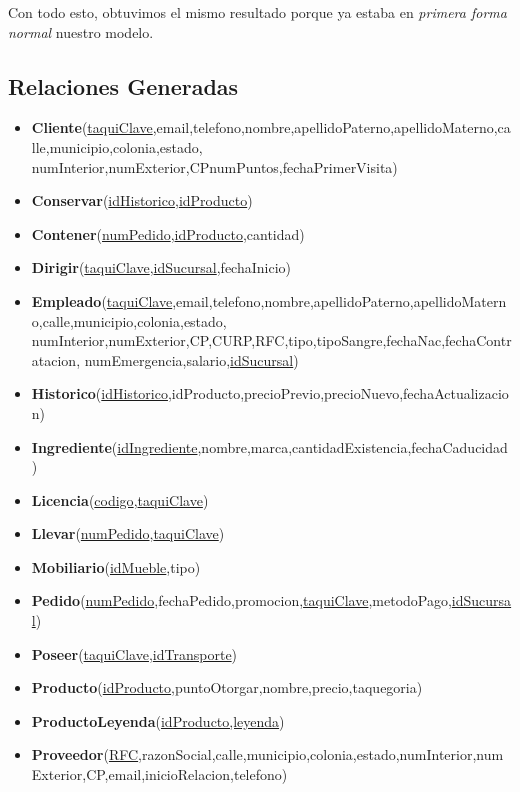 \documentclass[11pt,letterpaper]{article}
\begin{document}
Con todo esto, obtuvimos el mismo resultado porque ya estaba en \textit{primera forma normal} nuestro modelo.

\subsection{Relaciones Generadas}
\begin{itemize}
\item \footnotesize{\textbf{Cliente}(\underline{taquiClave},email,telefono,nombre,apellidoPaterno,apellidoMaterno,calle,municipio,colonia,estado,
numInterior,numExterior,CPnumPuntos,fechaPrimerVisita)}
\item \footnotesize{\textbf{Conservar}(\underline{idHistorico},\underline{idProducto})}
\item \footnotesize{\textbf{Contener}(\underline{numPedido},\underline{idProducto},cantidad)}
\item \footnotesize{\textbf{Dirigir}(\underline{taquiClave},\underline{idSucursal},fechaInicio)}
\item \footnotesize{\textbf{Empleado}(\underline{taquiClave},email,telefono,nombre,apellidoPaterno,apellidoMaterno,calle,municipio,colonia,estado,
numInterior,numExterior,CP,CURP,RFC,tipo,tipoSangre,fechaNac,fechaContratacion,
numEmergencia,salario,\underline{idSucursal})}
\item \footnotesize{\textbf{Historico}(\underline{idHistorico},idProducto,precioPrevio,precioNuevo,fechaActualizacion)}
\item \footnotesize{\textbf{Ingrediente}(\underline{idIngrediente},nombre,marca,cantidadExistencia,fechaCaducidad)}
\item \footnotesize{\textbf{Licencia}(\underline{codigo},\underline{taquiClave}})
\item \footnotesize{\textbf{Llevar}(\underline{numPedido},\underline{taquiClave})}
\item \footnotesize{\textbf{Mobiliario}(\underline{idMueble},tipo)}
\item \footnotesize{\textbf{Pedido}(\underline{numPedido},fechaPedido,promocion,\underline{taquiClave},metodoPago,\underline{idSucursal})}
\item \footnotesize{\textbf{Poseer}(\underline{taquiClave},\underline{idTransporte})}
\item \footnotesize{\textbf{Producto}(\underline{idProducto},puntoOtorgar,nombre,precio,taquegoria)}
\item \footnotesize{\textbf{ProductoLeyenda}(\underline{idProducto,leyenda})}
\item \scriptsize{\textbf{Proveedor}(\underline{RFC},razonSocial,calle,municipio,colonia,estado,numInterior,numExterior,CP,email,inicioRelacion,telefono)}

\end{itemize}
\end{document}
